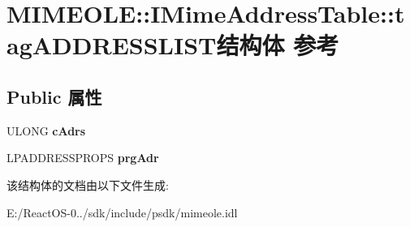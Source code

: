 \hypertarget{struct_m_i_m_e_o_l_e_1_1_i_mime_address_table_1_1tag_a_d_d_r_e_s_s_l_i_s_t}{}\section{M\+I\+M\+E\+O\+LE\+:\+:I\+Mime\+Address\+Table\+:\+:tag\+A\+D\+D\+R\+E\+S\+S\+L\+I\+S\+T结构体 参考}
\label{struct_m_i_m_e_o_l_e_1_1_i_mime_address_table_1_1tag_a_d_d_r_e_s_s_l_i_s_t}
\subsection*{Public 属性}
\begin{DoxyCompactItemize}
\item 
\mbox{\label{struct_m_i_m_e_o_l_e_1_1_i_mime_address_table_1_1tag_a_d_d_r_e_s_s_l_i_s_t_ab0f2a82b73709dd1556fe850f34f6265}} 
U\+L\+O\+NG {\bfseries c\+Adrs}
\item 
\mbox{\label{struct_m_i_m_e_o_l_e_1_1_i_mime_address_table_1_1tag_a_d_d_r_e_s_s_l_i_s_t_a44afce6358e301d80e16588793afcae4}} 
L\+P\+A\+D\+D\+R\+E\+S\+S\+P\+R\+O\+PS {\bfseries prg\+Adr}
\end{DoxyCompactItemize}


该结构体的文档由以下文件生成\+:\begin{DoxyCompactItemize}
\item 
E\+:/\+React\+O\+S-\/0../sdk/include/psdk/mimeole.\+idl\end{DoxyCompactItemize}
